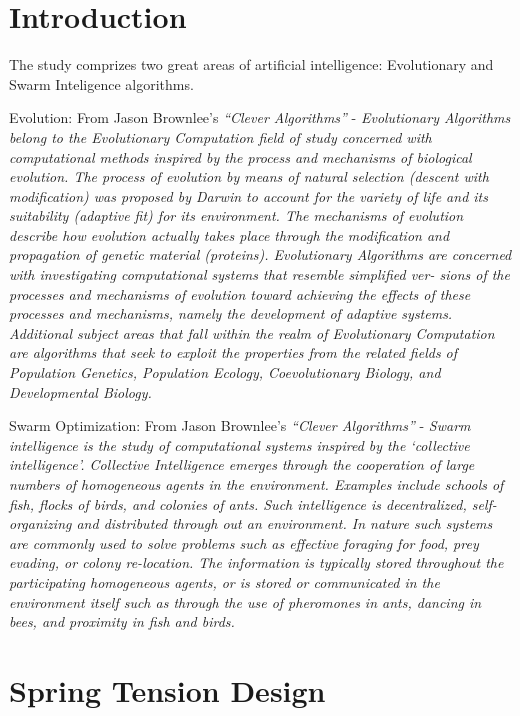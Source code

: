 \documentclass[conference]{IEEEtran}
\begin{document}
\section{Introduction}
\label{sec:introduction}

The study comprizes two great areas of artificial intelligence: Evolutionary
and Swarm Inteligence algorithms.

Evolution: From Jason Brownlee's \textit{``Clever Algorithms''} -
\textit{Evolutionary Algorithms belong to the Evolutionary Computation
field of study concerned with computational methods inspired by the process
and mechanisms of biological evolution. The process of evolution by
means of natural selection (descent with modification) was proposed by
Darwin to account for the variety of life and its suitability (adaptive
fit) for its environment. The mechanisms of evolution describe how
evolution actually takes place through the modification and propagation
of genetic material (proteins). Evolutionary Algorithms are concerned
with investigating computational systems that resemble simplified ver-
sions of the processes and mechanisms of evolution toward achieving
the effects of these processes and mechanisms, namely the development
of adaptive systems. Additional subject areas that fall within the realm
of Evolutionary Computation are algorithms that seek to exploit the
properties from the related fields of Population Genetics, Population
Ecology, Coevolutionary Biology, and Developmental Biology.}

Swarm Optimization: From Jason Brownlee's \textit{``Clever Algorithms''} -
\textit{Swarm intelligence is the study of computational systems inspired by
the ‘collective intelligence’. Collective Intelligence emerges through the
cooperation of large numbers of homogeneous agents in the environment.
Examples include schools of fish, flocks of birds, and colonies of ants.
Such intelligence is decentralized, self-organizing and distributed through
out an environment. In nature such systems are commonly used to
solve problems such as effective foraging for food, prey evading, or
colony re-location. The information is typically stored throughout the
participating homogeneous agents, or is stored or communicated in
the environment itself such as through the use of pheromones in ants,
dancing in bees, and proximity in fish and birds.}

    \section{Spring Tension Design}
\end{document}
